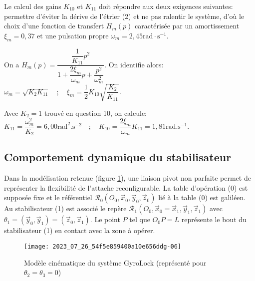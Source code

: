 Le calcul des gains $K_{10}$ et $K_{11}$ doit répondre aux deux exigences suivantes: permettre d'éviter la dérive de l'étrier (2) et ne pas ralentir le système, d'où le choix d'une fonction de transfert $H_{m}(p)$ caractérisée par un amortissement $\xi_{m}=0,37$ et une pulsation propre $\omega_{m}=2,45 \mathrm{rad} \cdot \mathrm{s}^{-1}$.

\ifprof
\begin{corrige}
On a $H_{m}(p) = \dfrac{\dfrac{1}{K_{11}}p^2}{1 + \dfrac{2\xi_m}{\omega_m}p + \dfrac{p^2}{\omega_m^2}}$. On identifie alors:
$ \omega_m = \sqrt{K_2 K_{11}} \quad ; \quad \xi_m = \dfrac{1}{2}K_{10}\sqrt{\dfrac{K_{2}}{K_{11}}} $.

Avec $K_2 = 1$ trouvé en question 10, on calcule:
$ \boxed{K_{11} = \dfrac{\omega_m^2}{K_2} = 6,00\text{rad}^2.\text{s}^{-2}} \quad ; \quad \boxed{K_{10} = \dfrac{2\xi_m}{\omega_m}K_{11} = 1,81\text{rad}.\text{s}^{-1}} $.
\end{corrige}
\else
\fi


\subsection{\label{sec:II.C} Comportement dynamique du stabilisateur}
\ifprof
\else
Dans la modélisation retenue (figure \ref{fig_ccspsi2022:09}), une liaison pivot non parfaite permet de représenter la flexibilité de l'attache reconfigurable. La table d'opération (0) est supposée fixe et le référentiel $\mathcal{R}_{0}\left(O_{0}, \vec{x}_{0}, \vec{y}_{0}, \vec{z}_{0}\right)$ lié à la table (0) est galiléen. Au stabilisateur (1) est associé le repère $\mathcal{R}_{1}\left(O_{0}, \vec{x}_{0}=\vec{x}_{1}, \vec{y}_{1}, \vec{z}_{1}\right)$ avec $\theta_{1}=\left(\vec{y}_{0}, \vec{y}_{1}\right)=\left(\vec{z}_{0}, \vec{z}_{1}\right)$. Le point $P$ tel que $O_{0} P=L$ représente le bout du stabilisateur (1) en contact avec la zone à opérer.

\begin{figure}[!h]
\centering
\texttt{[image: 2023\_07\_26\_54f5e859400a10e656ddg-06]}
\caption{\label{fig_ccspsi2022:09}Modèle cinématique du système GyroLock (représenté pour $\theta_{2}=\theta_{3}=0$)}
\end{figure}
\fi

